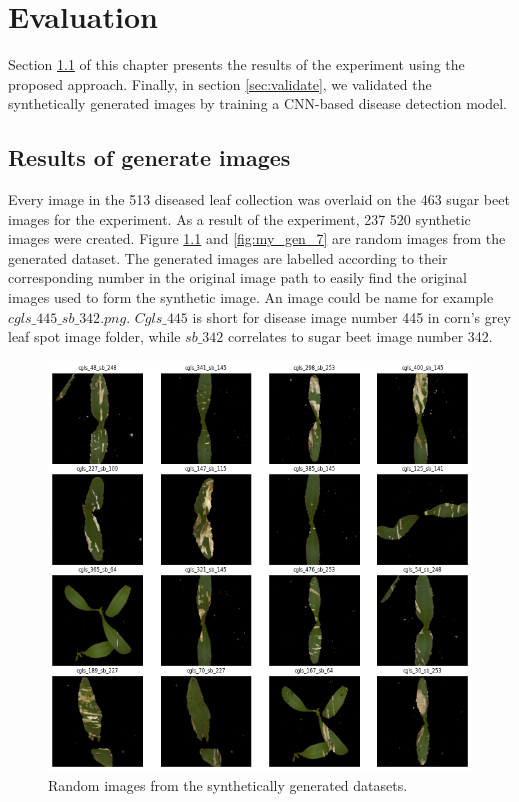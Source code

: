 \chapter{Evaluation}\label{cha:Evaluation}
Section \ref{sec:results} of this chapter presents the results of the experiment using the proposed approach. Finally, in section \ref{sec:validate}, we validated the synthetically generated images by training a CNN-based disease detection model.


\section{Results of generate images}\label{sec:results}
Every image in the 513 diseased leaf collection was overlaid on the 463 sugar beet images for the experiment. As a result of the experiment, 237 520 synthetic images were created. Figure \ref{fig:my_gen_6} and \ref{fig:my_gen_7} are random images from the generated dataset. The generated images are labelled according to their corresponding number in the original image path to easily find the original images used to form the synthetic image. An image could be name for example $cgls\_445\_sb\_342.png$. $Cgls\_445$ is short for disease image number 445 in corn's grey leaf spot image folder, while $sb\_342$ correlates to sugar beet image number 342.

\begin{figure}[!htb]
    \centering
    \includegraphics[scale=0.49, keepaspectratio]{Figures/notebook/gen-15.png}
    \caption{Random images from the synthetically generated datasets.}
    \label{fig:my_gen_6}
\end{figure} 

